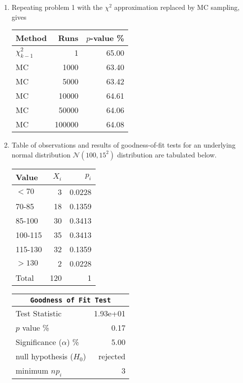 \begin{enumerate}
\begin{table}[H]
\begin{minipage}{0.4\textwidth}
		\end{minipage}
	\end{table}
	\bigskip
	
	\item Repeating problem 1 with the $ \chi^2 $ approximation replaced by MC sampling, gives
	\begin{table}[H]
		\centering
		\begin{tabular}{@{}lrr@{}}
			\toprule
			Method &  Runs & $ p $-value \% \\
			\midrule
			$ \chi^2_{k-1} $ &  1 &   65.00 \\
			MC & 1000 &   63.40 \\
			MC & 5000 &   63.42 \\
			MC & 10000 &   64.61 \\
			MC & 50000 &   64.06 \\
			MC & 100000 &   64.08 \\
			\bottomrule
		\end{tabular}
	\end{table}
	
	\item Table of observations and results of goodness-of-fit tests for an underlying normal distribution $ \mathcal{N}(100, 15^2) $ distribution are tabulated below.
	
	\begin{table}[H]
		\centering
		\begin{minipage}{0.4\textwidth}
			\centering
			\begin{tabular}{@{}lrr@{}}
				\toprule
				Value & $X_i$ &   $p_i$ \\
				\midrule
				$ <70 $     &     3 &  0.0228 \\
				70-85   &    18 &  0.1359 \\
				85-100  &    30 &  0.3413 \\
				100-115 &    35 &  0.3413 \\
				115-130 &    32 &  0.1359 \\
				$ >130 $    &     2 &  0.0228 \\
				\midrule
				Total   &   120 &       1 \\
				\bottomrule
			\end{tabular}
			
		\end{minipage}
		\begin{minipage}{0.4\textwidth}
			\centering
			\begin{tabular}{@{}lr@{}}
				\toprule
				\multicolumn{2}{c}{\texttt{Goodness of Fit Test}} \\
				\midrule
				Test Statistic             &  1.93e+01 \\
				$p$ value \%               &      0.17 \\
				Significance ($\alpha$) \% &      5.00 \\
				null hypothesis ($H_0$)    &  rejected \\
				minimum $n p_i$            &         3 \\
				\bottomrule
			\end{tabular}
			

\end{minipage}
\end{table}
\end{enumerate}
